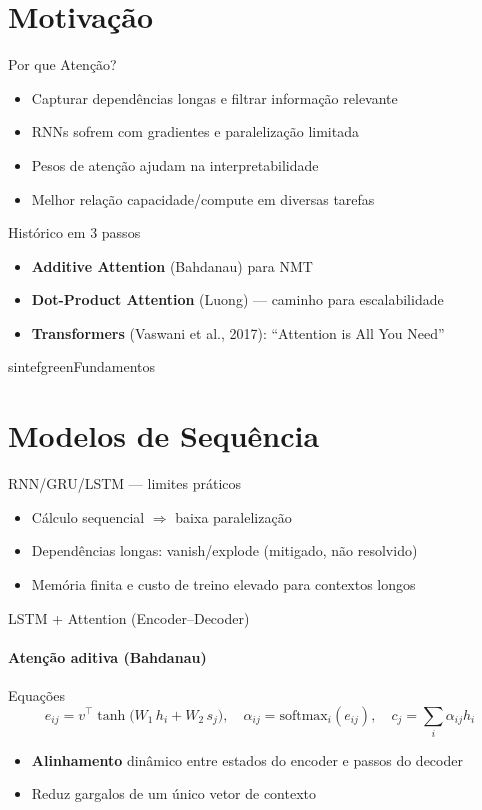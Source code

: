 \documentclass{beamer}
\begin{document}
\section{Motivação}
\begin{frame}{Por que Atenção?}
\begin{itemize}[<+->]
  \item Capturar dependências longas e filtrar informação relevante
  \item RNNs sofrem com gradientes e paralelização limitada
  \item Pesos de atenção ajudam na interpretabilidade
  \item Melhor relação capacidade/compute em diversas tarefas
\end{itemize}
\end{frame}

\begin{frame}{Histórico em 3 passos}
\begin{itemize}[<+->]
  \item \textbf{Additive Attention} (Bahdanau) para NMT
  \item \textbf{Dot-Product Attention} (Luong) — caminho para escalabilidade
  \item \textbf{Transformers} (Vaswani et al., 2017): “Attention is All You Need”
\end{itemize}
\end{frame}

\begin{chapter}{sintefgreen}{Fundamentos}\end{chapter}

\section{Modelos de Sequência}
\begin{frame}{RNN/GRU/LSTM — limites práticos}
\begin{itemize}[<+->]
  \item Cálculo sequencial $\Rightarrow$ baixa paralelização
  \item Dependências longas: vanish/explode (mitigado, não resolvido)
  \item Memória finita e custo de treino elevado para contextos longos
\end{itemize}
\end{frame}

\begin{frame}{LSTM + Attention (Encoder--Decoder)}
\framesubtitle{Atenção aditiva (Bahdanau)}
\begin{block}{Equações}
\small
\[
e_{ij} = v^\top \tanh\!\big(W_1\,h_i + W_2\,s_j\big), \quad
\alpha_{ij} = \mathrm{softmax}_i(e_{ij}), \quad
c_j = \sum_i \alpha_{ij} h_i
\]
\end{block}
\begin{itemize}[<+->]
  \item \textbf{Alinhamento} dinâmico entre estados do encoder e passos do decoder
  \item Reduz gargalos de um único vetor de contexto
\end{itemize}
\end{frame}
\end{document}
